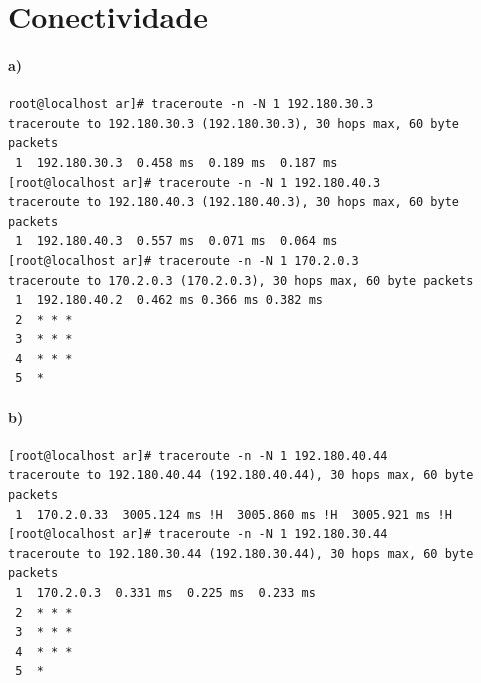 \section{Conectividade}
\paragraph{a)}
\begin{verbatim}
root@localhost ar]# traceroute -n -N 1 192.180.30.3
traceroute to 192.180.30.3 (192.180.30.3), 30 hops max, 60 byte packets
 1  192.180.30.3  0.458 ms  0.189 ms  0.187 ms
[root@localhost ar]# traceroute -n -N 1 192.180.40.3
traceroute to 192.180.40.3 (192.180.40.3), 30 hops max, 60 byte packets
 1  192.180.40.3  0.557 ms  0.071 ms  0.064 ms
[root@localhost ar]# traceroute -n -N 1 170.2.0.3
traceroute to 170.2.0.3 (170.2.0.3), 30 hops max, 60 byte packets
 1  192.180.40.2  0.462 ms 0.366 ms 0.382 ms
 2  * * *
 3  * * *
 4  * * *
 5  *
\end{verbatim}

\paragraph{b)}
\begin{verbatim}
[root@localhost ar]# traceroute -n -N 1 192.180.40.44                    
traceroute to 192.180.40.44 (192.180.40.44), 30 hops max, 60 byte packets
 1  170.2.0.33  3005.124 ms !H  3005.860 ms !H  3005.921 ms !H           
[root@localhost ar]# traceroute -n -N 1 192.180.30.44                    
traceroute to 192.180.30.44 (192.180.30.44), 30 hops max, 60 byte packets
 1  170.2.0.3  0.331 ms  0.225 ms  0.233 ms                              
 2  * * *                                                                
 3  * * *                                                                
 4  * * *                                                                
 5  *                                                                    
\end{verbatim}

